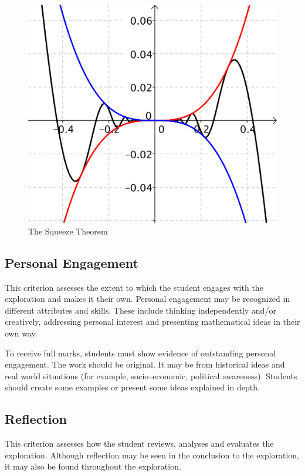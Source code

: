 \documentclass[11pt]{article}
\begin{document}
\begin{figure}[H]
    \centering
    \includegraphics[scale=0.5]{limit}
    \caption{The Squeeze Theorem}
    \label{fig:squeeze}
\end{figure}

\subsection{Personal Engagement}

This criterion assesses the extent to which the student engages with the 
exploration and makes it their own. Personal engagement may be recognized 
in different attributes and skills. These include thinking independently and/or 
creatively, addressing personal interest and presenting mathematical ideas in 
their own way.

To receive full marks, students must show evidence of outstanding personal 
engagement. The work should be original. It may be from historical ideas and 
real world situations (for example, socio–economic, political awareness). 
Students should create some examples or present some ideas explained in depth.

\subsection{Reflection}

This criterion assesses how the student reviews, analyses and evaluates the 
exploration. Although reflection may be seen in the conclusion to the exploration, 
it may also be found throughout the exploration.
\end{document}
